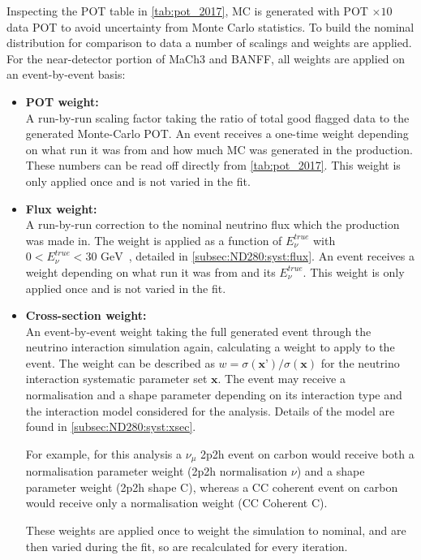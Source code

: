 Inspecting the POT table in \autoref{tab:pot_2017}, MC is generated with POT $\times10$ data POT to avoid uncertainty from Monte Carlo statistics. To build the nominal distribution for comparison to data a number of scalings and weights are applied. For the near-detector portion of MaCh3 and BANFF, all weights are applied on an event-by-event basis:
\begin{itemize}
	\item \textbf{POT weight:} \\
	A run-by-run scaling factor taking the ratio of total good flagged data to the generated Monte-Carlo POT. An event receives a one-time weight depending on what run it was from and how much MC was generated in the production. These numbers can be read off directly from \autoref{tab:pot_2017}. This weight is only applied once and is not varied in the fit.
	
	\item \textbf{Flux weight:} \\
	A run-by-run correction to the nominal neutrino flux which the production was made in. The weight is applied as a function of $E_\nu^{true}$ with~$0 < E_\nu^{true} < 30 \text{ GeV}$~, detailed in \autoref{subsec:ND280:syst:flux}. An event receives a weight depending on what run it was from and its $E_\nu^{true}$. This weight is only applied once and is not varied in the fit.
	
	\item \textbf{Cross-section weight:} \\
	An event-by-event weight taking the full generated event through the neutrino interaction simulation again, calculating a weight to apply to the event. The weight can be described as $w=\sigma(\textbf{x'})/\sigma(\textbf{x})$ for the neutrino interaction systematic parameter set $\textbf{x}$. The event may receive a normalisation and a shape parameter depending on its interaction type and the interaction model considered for the analysis. Details of the model are found in \autoref{subsec:ND280:syst:xsec}.
	
	For example, for this analysis a $\nu_\mu$ 2p2h event on carbon would receive both a normalisation parameter weight (2p2h normalisation $\nu$) and a shape parameter weight (2p2h shape C), whereas a CC coherent event on carbon would receive only a normalisation weight (CC Coherent C).
	
	These weights are applied once to weight the simulation to nominal, and are then varied during the fit, so are recalculated for every iteration.
	

\end{itemize}

